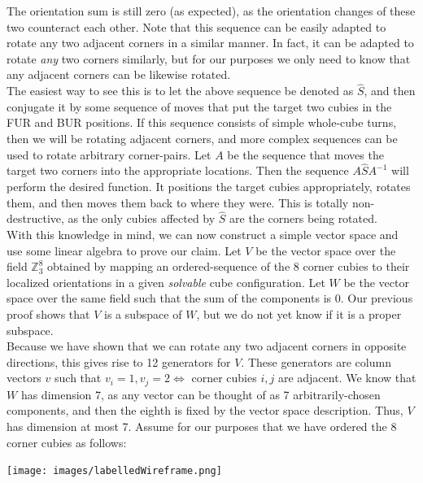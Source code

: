 \documentclass[10pt,letterpaper]{report}
\begin{document}
The orientation sum is still zero (as expected), as the orientation changes of these two counteract each other.  Note that this sequence can be easily adapted to rotate any two adjacent corners in a similar manner.  In fact, it can be adapted to rotate \textit{any} two corners similarly, but for our purposes we only need to know that any adjacent corners can be likewise rotated. \\

The easiest way to see this is to let the above sequence be denoted as $\hat{S}$, and then conjugate it by some sequence of moves that put the target two cubies in the FUR and BUR positions.  If this sequence consists of simple whole-cube turns, then we will be rotating adjacent corners, and more complex sequences can be used to rotate arbitrary corner-pairs.  Let $A$ be the sequence that moves the target two corners into the appropriate locations.  Then the sequence $A\hat{S}A^{-1}$ will perform the desired function.  It positions the target cubies appropriately, rotates them, and then moves them back to where they were.  This is totally non-destructive, as the only cubies affected by $\hat{S}$ are the corners being rotated. \\

With this knowledge in mind, we can now construct a simple vector space and use some linear algebra to prove our claim.  Let $V$ be the vector space over the field $\mathbb{Z}_3^8$ obtained by mapping an ordered-sequence of the 8 corner cubies to their localized orientations in a given \textit{solvable} cube configuration.   Let $W$ be the vector space over the same field such that the sum of the components is 0.  Our previous proof shows that $V$ is a subspace of $W$, but we do not yet know if it is a proper subspace. \\

Because we have shown that we can rotate any two adjacent corners in opposite directions, this gives rise to 12 generators for $V$.  These generators are column vectors $v$ such that $v_i = 1, v_j = 2 \Leftrightarrow $ corner cubies $i,j$ are adjacent.  We know that $W$ has dimension 7, as any vector can be thought of as 7 arbitrarily-chosen components, and then the eighth is fixed by the vector space description.  Thus, $V$ has dimension at most 7.  Assume for our purposes that we have ordered the 8 corner cubies as follows:

\begin{center}
\texttt{[image: images/labelledWireframe.png]} 
\end{center}
\end{document}
